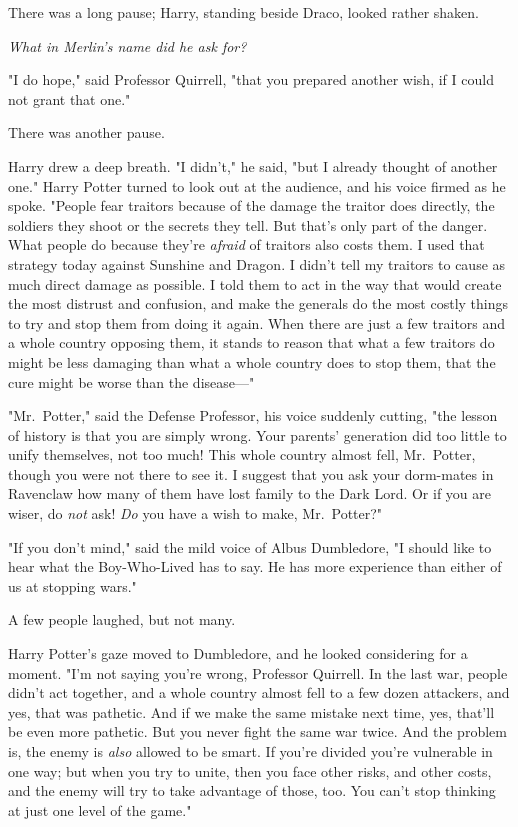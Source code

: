 There was a long pause; Harry, standing beside Draco, looked rather shaken.

\emph{What in Merlin's name did he ask for?}

"I do hope," said Professor Quirrell, "that you prepared another wish, if I
could not grant that one."

There was another pause.

Harry drew a deep breath. "I didn't," he said, "but I already thought of
another one." Harry Potter turned to look out at the audience, and his voice
firmed as he spoke. "People fear traitors because of the damage the traitor
does directly, the soldiers they shoot or the secrets they tell. But that's
only part of the danger. What people do because they're \emph{afraid} of
traitors also costs them. I used that strategy today against Sunshine and
Dragon. I didn't tell my traitors to cause as much direct damage as possible. I
told them to act in the way that would create the most distrust and confusion,
and make the generals do the most costly things to try and stop them from doing
it again. When there are just a few traitors and a whole country opposing them,
it stands to reason that what a few traitors do might be less damaging than
what a whole country does to stop them, that the cure might be worse than the
disease---"

"Mr.~Potter," said the Defense Professor, his voice suddenly cutting, "the
lesson of history is that you are simply wrong. Your parents' generation did
too little to unify themselves, not too much! This whole country almost fell,
Mr.~Potter, though you were not there to see it. I suggest that you ask your
dorm-mates in Ravenclaw how many of them have lost family to the Dark Lord. Or
if you are wiser, do \emph{not} ask! \emph{Do} you have a wish to make,
Mr.~Potter?"

"If you don't mind," said the mild voice of Albus Dumbledore, "I should like to
hear what the Boy-Who-Lived has to say. He has more experience than either of
us at stopping wars."

A few people laughed, but not many.

Harry Potter's gaze moved to Dumbledore, and he looked considering for a
moment. "I'm not saying you're wrong, Professor Quirrell. In the last war,
people didn't act together, and a whole country almost fell to a few dozen
attackers, and yes, that was pathetic. And if we make the same mistake next
time, yes, that'll be even more pathetic. But you never fight the same war
twice. And the problem is, the enemy is \emph{also} allowed to be smart. If
you're divided you're vulnerable in one way; but when you try to unite, then
you face other risks, and other costs, and the enemy will try to take advantage
of those, too. You can't stop thinking at just one level of the game."

